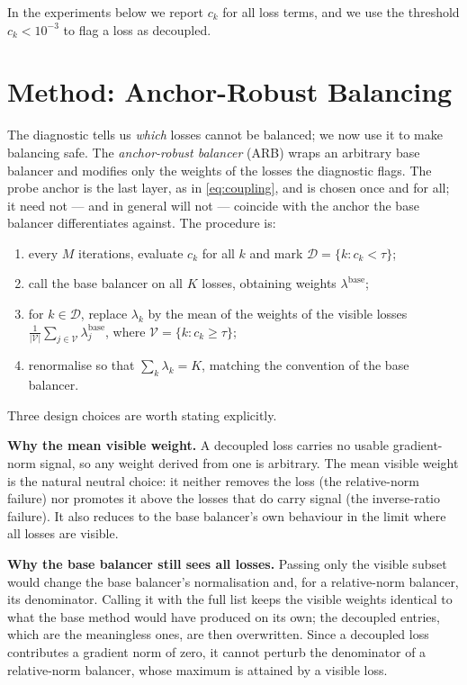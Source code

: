 \documentclass[a4paper,fleqn]{cas-sc}
\begin{document}
In the experiments below we report $c_k$ for all loss terms, and we use the
threshold $c_k < 10^{-3}$ to flag a loss as decoupled.

\section{Method: Anchor-Robust Balancing}
\label{sec:method}

The diagnostic tells us \emph{which} losses cannot be balanced; we now use it
to make balancing safe. The \emph{anchor-robust balancer} (ARB) wraps an
arbitrary base balancer and modifies only the weights of the losses the
diagnostic flags. The probe anchor is the last layer, as in
\eqref{eq:coupling}, and is chosen once and for all; it need not --- and in
general will not --- coincide with the anchor the base balancer differentiates
against. The procedure is:

\begin{enumerate}
\item every $M$ iterations, evaluate $c_k$ for all $k$ and mark
$\mathcal{D} = \{k : c_k < \tau\}$;
\item call the base balancer on all $K$ losses, obtaining weights
$\lambda^{\text{base}}$;
\item for $k \in \mathcal{D}$, replace $\lambda_k$ by the mean of the weights of
the visible losses $\frac{1}{|\mathcal{V}|}\sum_{j \in \mathcal{V}}
\lambda_j^{\text{base}}$, where $\mathcal{V} = \{k : c_k \geq \tau\}$;
\item renormalise so that $\sum_k \lambda_k = K$, matching the convention of
the base balancer.
\end{enumerate}

Three design choices are worth stating explicitly.

\textbf{Why the mean visible weight.} A decoupled loss carries no usable
gradient-norm signal, so any weight derived from one is arbitrary. The mean
visible weight is the natural neutral choice: it neither removes the loss
(the relative-norm failure) nor promotes it above the losses that do carry
signal (the inverse-ratio failure). It also reduces to the base balancer's own
behaviour in the limit where all losses are visible.

\textbf{Why the base balancer still sees all losses.} Passing only the visible
subset would change the base balancer's normalisation and, for a relative-norm
balancer, its denominator. Calling it with the full list keeps the visible
weights identical to what the base method would have produced on its own; the
decoupled entries, which are the meaningless ones, are then overwritten. Since a
decoupled loss contributes a gradient norm of zero, it cannot perturb the
denominator of a relative-norm balancer, whose maximum is attained by a visible
loss.
\end{document}
